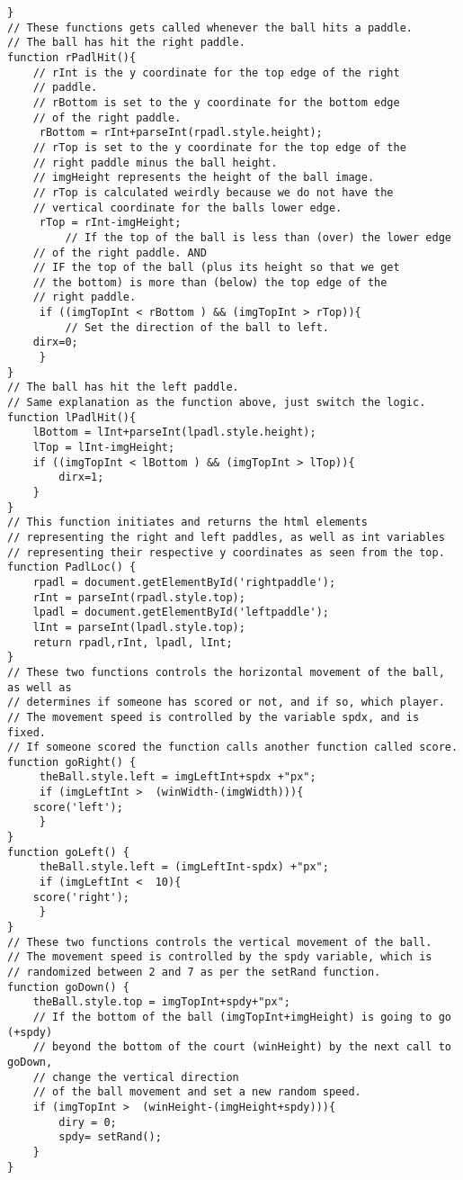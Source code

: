 \documentclass[a4paper,10pt]{article}
\begin{document}
\begin{verbatim}
}
// These functions gets called whenever the ball hits a paddle.
// The ball has hit the right paddle.
function rPadlHit(){
    // rInt is the y coordinate for the top edge of the right
    // paddle.
    // rBottom is set to the y coordinate for the bottom edge
    // of the right paddle.
     rBottom = rInt+parseInt(rpadl.style.height);
    // rTop is set to the y coordinate for the top edge of the
    // right paddle minus the ball height.
    // imgHeight represents the height of the ball image.
    // rTop is calculated weirdly because we do not have the
    // vertical coordinate for the balls lower edge.
     rTop = rInt-imgHeight;
         // If the top of the ball is less than (over) the lower edge
    // of the right paddle. AND
    // IF the top of the ball (plus its height so that we get
    // the bottom) is more than (below) the top edge of the 
    // right paddle.
     if ((imgTopInt < rBottom ) && (imgTopInt > rTop)){
         // Set the direction of the ball to left.
    dirx=0;
     }   
}
// The ball has hit the left paddle.
// Same explanation as the function above, just switch the logic.
function lPadlHit(){
    lBottom = lInt+parseInt(lpadl.style.height);
    lTop = lInt-imgHeight;
    if ((imgTopInt < lBottom ) && (imgTopInt > lTop)){
        dirx=1;
    }
}
// This function initiates and returns the html elements
// representing the right and left paddles, as well as int variables
// representing their respective y coordinates as seen from the top.
function PadlLoc() {
    rpadl = document.getElementById('rightpaddle');
    rInt = parseInt(rpadl.style.top);
    lpadl = document.getElementById('leftpaddle');
    lInt = parseInt(lpadl.style.top);
    return rpadl,rInt, lpadl, lInt;
}
// These two functions controls the horizontal movement of the ball, as well as
// determines if someone has scored or not, and if so, which player.
// The movement speed is controlled by the variable spdx, and is fixed.
// If someone scored the function calls another function called score.
function goRight() {
     theBall.style.left = imgLeftInt+spdx +"px";
     if (imgLeftInt >  (winWidth-(imgWidth))){
    score('left');
     }
}
function goLeft() {
     theBall.style.left = (imgLeftInt-spdx) +"px";
     if (imgLeftInt <  10){
    score('right');
     }
}
// These two functions controls the vertical movement of the ball.
// The movement speed is controlled by the spdy variable, which is 
// randomized between 2 and 7 as per the setRand function.
function goDown() {
    theBall.style.top = imgTopInt+spdy+"px";
    // If the bottom of the ball (imgTopInt+imgHeight) is going to go (+spdy) 
    // beyond the bottom of the court (winHeight) by the next call to goDown, 
    // change the vertical direction 
    // of the ball movement and set a new random speed.
    if (imgTopInt >  (winHeight-(imgHeight+spdy))){
        diry = 0;
        spdy= setRand();
    }
}


\end{verbatim}
\end{document}
